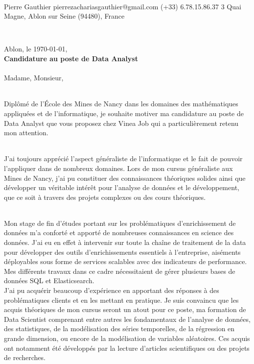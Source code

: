 \documentclass{cv_style}
\begin{document}
\vspace{3cm}\\
    {Pierre Gauthier}
    {{pierrezachariasgauthier@gmail.com}}
    {{(+33) 6.78.15.86.37}}
    {3 Quai Magne, Ablon sur Seine  (94480), France}


%
\vspace{2cm}\\
\begin{flushleft}
    \hfill Ablon, le \today, \\
    \large
    \textbf{Candidature au poste de Data Analyst  }  
    \vspace{0.2cm} \\
    \\[0.2cm]
    Madame, Monsieur,
\end{flushleft}
\vspace{0.0cm}
\large

    \vspace{0.2cm} \\
    Diplômé de l'École des Mines de Nancy dans les domaines des mathématiques appliquées et de l'informatique, je souhaite motiver ma candidature au poste de Data Analyst que vous proposez chez Vinea Job qui a particulièrement retenu mon attention. 

    \vspace{0.2cm} \\
    J'ai toujours apprécié l'aspect généraliste de l'informatique et le fait de pouvoir l'appliquer dans de nombreux domaines. Lors de mon cursus généraliste aux Mines de Nancy, j'ai pu constituer des connaissances théoriques solides ainsi que développer un véritable intérêt pour l'analyse de données et le développement, que ce soit à travers des projets complexes ou des cours théoriques. 

    \vspace{0.2cm} \\
    Mon stage de fin d'études portant sur les problématiques d'enrichissement de données m'a conforté et apporté de nombreuses connaissances en science des données. J'ai eu en effet à intervenir sur toute la chaîne de traitement de la data pour développer des outils d'enrichissements essentiels à l'entreprise, aiséments déployables sous forme de services scalables avec des indicateurs de performance. Mes différents travaux dans ce cadre nécessitaient de gérer plusieurs bases de données SQL et Elasticsearch.
    \vspace{0.2cm} \\
    J'ai pu acquérir beaucoup d'expérience en apportant des réponses à des problématiques clients et en les mettant en pratique. 
    Je suis convaincu que les acquis théoriques de mon cursus seront un atout pour ce poste, ma formation de Data Scientist comprenant entre autres les fondamentaux de l'analyse de données, des statistiques, de la modélisation des séries temporelles, de la régression en grande dimension, ou encore de la modélisation de variables aléatoires. Ces acquis ont notamment été développés par la lecture d'articles scientifiques ou des projets de recherches.       
\end{document}
